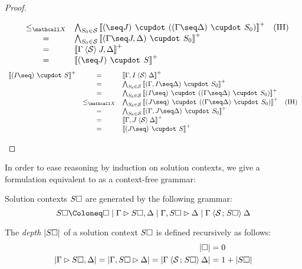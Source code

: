 \begin{proof}
\begin{itemize}
$$\begin{array}{rcll}
      &\sementX& \bigwedge_{S_0 \in \cS}{\psint{(\seq J) \mix ((\Gamma \seq \Delta) \mix S_0)}} &\text{(IH)} \\
      &=& \bigwedge_{S_0 \in \cS}{\psint{(\Gamma \seq J, \Delta) \mix S_0}} & \\
      &=& \psint{\Gamma \piq{\cS} J, \Delta} & \\
      &=& \psint{(\seq J) \mix S} &
    \end{array}
    $$
    $$
    \begin{array}{rcll}
      \psint{(I \seq) \mix S}
      &=& \psint{\Gamma, I \piq{\cS} \Delta} & \\
      &=& \bigwedge_{S_0 \in \cS}{\psint{(\Gamma, I \seq \Delta) \mix S_0}} & \\
      &=& \bigwedge_{S_0 \in \cS}{\psint{(I \seq) \mix ((\Gamma \seq \Delta) \mix S_0)}} & \\
      &\sementX& \bigwedge_{S_0 \in \cS}{\psint{(J \seq) \mix ((\Gamma \seq \Delta) \mix S_0)}} &\text{(IH)} \\
      &=& \bigwedge_{S_0 \in \cS}{\psint{(\Gamma, J \seq \Delta) \mix S_0}} & \\
      &=& \psint{\Gamma, J \piq{\cS} \Delta} & \\
      &=& \psint{(J \seq) \mix S} &
    \end{array}
    $$
  \end{itemize}
\end{proof}

In order to ease reasoning by induction on solution contexts, we give a
formulation equivalent to  as a context-free grammar:
\begin{fact}
  Solution contexts $S\square$ are generated by the following grammar:
  $$
    S\hole \Coloneq \hole \mid \Gamma \J S\hole, \Delta
                          \mid \Gamma, S\hole \J \Delta
                          \mid \Gamma \piq{\cS \sep S\hole} \Delta
  $$
\end{fact}

\begin{definition}
The \emph{depth} $\left|S\square\right|$ of a solution context $S\square$ is defined
recursively as follows:
\begin{align*}
  \left|\square\right| &= 0 \\
  \left|\Gamma \mathbin{\rhd} S\square, \Delta\right| = \left|\Gamma, S\square \mathbin{\rhd} \Delta\right| =
  \left|\Gamma \mathbin{\langle \mathcal{S} \;\!;\!\; S\square \rangle} \Delta\right| &= 1 + \left|S\square\right|
\end{align*}
\end{definition}

